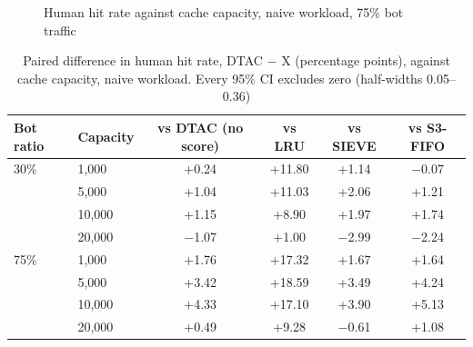 \begin{figure}[htbp]
    \centering
    \caption{Human hit rate against cache capacity, naive workload, 75\% bot traffic}
    \label{fig:capacity}
\end{figure}

\begin{table}[htbp]
    \centering
    \caption{Paired difference in human hit rate, DTAC $-$ X (percentage points), against cache capacity, naive workload. Every 95\% CI excludes zero (half-widths 0.05--0.36)}
    \label{tab:paired-capacity}
    \small
    \begin{tabular}{llcccc}
        \toprule
        Bot ratio & Capacity & vs DTAC (no score) & vs LRU & vs SIEVE & vs S3-FIFO \\
        \midrule
        30\% & 1{,}000 & +0.24 & +11.80 & +1.14 & $-$0.07 \\
         & 5{,}000 & +1.04 & +11.03 & +2.06 & +1.21 \\
         & 10{,}000 & +1.15 & +8.90 & +1.97 & +1.74 \\
         & 20{,}000 & $-$1.07 & +1.00 & $-$2.99 & $-$2.24 \\
        \midrule
        75\% & 1{,}000 & +1.76 & +17.32 & +1.67 & +1.64 \\
         & 5{,}000 & +3.42 & +18.59 & +3.49 & +4.24 \\
         & 10{,}000 & +4.33 & +17.10 & +3.90 & +5.13 \\
         & 20{,}000 & +0.49 & +9.28 & $-$0.61 & +1.08 \\
        \bottomrule
    \end{tabular}
\end{table}

